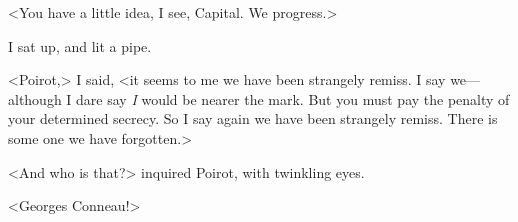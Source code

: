  <You have a little idea, I see,  Capital. We progress.> 

 I sat up, and lit a pipe. 

 <Poirot,> I said, <it seems to me we have been strangely remiss. I say we—although I dare say \emph{I} would be nearer the mark. But you must pay the penalty of your determined secrecy. So I say again we have been strangely remiss. There is some one we have forgotten.> 

 <And who is that?> inquired Poirot, with twinkling eyes. 

 <Georges Conneau!>